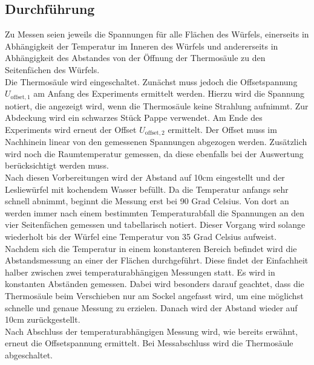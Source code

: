 \subsection{Durchführung}
Zu Messen seien jeweils die Spannungen für alle Flächen des Würfels, einerseits in Abhängigkeit der Temperatur im Inneren des Würfels und andererseits in Abhängigkeit des Abstandes von der Öffnung der Thermosäule zu den Seitenfächen des Würfels. \\
Die Thermosäule wird eingeschaltet.
Zunächst muss jedoch die Offsetspannung $U_{\text{offset},1}$ am Anfang des Experiments ermittelt werden.
Hierzu wird die Spannung notiert, die angezeigt wird, wenn die Thermosäule keine Strahlung aufnimmt.
Zur Abdeckung wird ein schwarzes Stück Pappe verwendet.
Am Ende des Experiments wird erneut der Offset $U_{\text{offset},2}$ ermittelt.
Der Offset muss im Nachhinein linear von den gemessenen Spannungen abgezogen werden.
Zusätzlich wird noch die Raumtemperatur gemessen, da diese ebenfalls bei der Auswertung berücksichtigt werden muss. \\
Nach diesen Vorbereitungen wird der Abstand auf 10cm eingestellt und der Lesliewürfel mit kochendem Wasser befüllt.
Da die Temperatur anfangs sehr schnell abnimmt, beginnt die Messung erst bei 90 Grad Celsius.
Von dort an werden immer nach einem bestimmten Temperaturabfall die Spannungen an den vier Seitenfächen gemessen und tabellarisch notiert.
Dieser Vorgang wird solange wiederholt bis der Würfel eine Temperatur von 35 Grad Celsius aufweist. \\
Nachdem sich die Temperatur in einem konstanteren Bereich befindet wird die Abstandsmessung an einer der Flächen durchgeführt.
Diese findet der Einfachheit halber zwischen zwei temperaturabhängigen Messungen statt.
Es wird in konstanten Abständen gemessen.
Dabei wird besonders darauf geachtet, dass die Thermosäule beim Verschieben nur am Sockel angefasst wird, um eine möglichst schnelle und genaue Messung zu erzielen.
Danach wird der Abstand wieder auf 10cm zurückgestellt.\\
Nach Abschluss der temperaturabhängigen Messung wird, wie bereits erwähnt, erneut die Offsetspannung ermittelt.
Bei Messabschluss wird die Thermosäule abgeschaltet.
